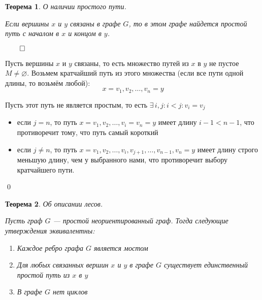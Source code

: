 \documentclass[a4paper,12pt,leqno]{article}
\theoremstyle{plain} %
\newtheorem{theorem}{Теорема}
\theoremstyle{definition} %
\renewenvironment{proof}{$\qed$}{{\qed}} %
\begin{document}
\begin{theorem} \textit{О наличии простого пути.}

Если вершины $x$ и $y$ связаны в графе $G$, то в этом графе найдется простой путь с началом в $x$ и концом в $y$.

\end{theorem}

\begin{proof}

Пусть вершины $x$ и $y$ связаны, то есть множество путей из $x$ в $y$ не пустое $M \neq \varnothing$. Возьмем кратчайший путь из этого множества (если все пути одной длины, то возьмём любой):
\[x = v_1, v_2,\dots,v_n = y\]

Пусть этот путь не является простым, то есть $\exists \, i, j : i < j : v_i = v_j$

\begin{itemize}
    \item если $j = n$, то путь $x = v_1, v_2,\dots,v_i = v_n = y$ имеет длину $i - 1 < n - 1$, что противоречит тому, что путь самый короткий
    
    \item если $j \neq n$, то путь $x = v_1, v_2, \dots, v_i, v_{j+1},\dots, v_{n-1}, v_n = y$ имеет длину строго меньшую длину, чем у выбранного нами, что противоречит выбору кратчайшего пути.
\end{itemize}

\end{proof}

\begin{theorem}\textit{Об описании лесов.}

Пусть граф $G$ --- простой неориентированный граф. Тогда следующие утверждения эквивалентны:

\begin{enumerate}
    \item Каждое ребро графа $G$ является мостом
    
    \item Для любых связанных вершин $x$ и $y$ в графе $G$ существует единственный простой путь из $x$ в $y$
    
    \item В графе $G$ нет циклов
\end{enumerate}

\end{theorem}
\end{document}
